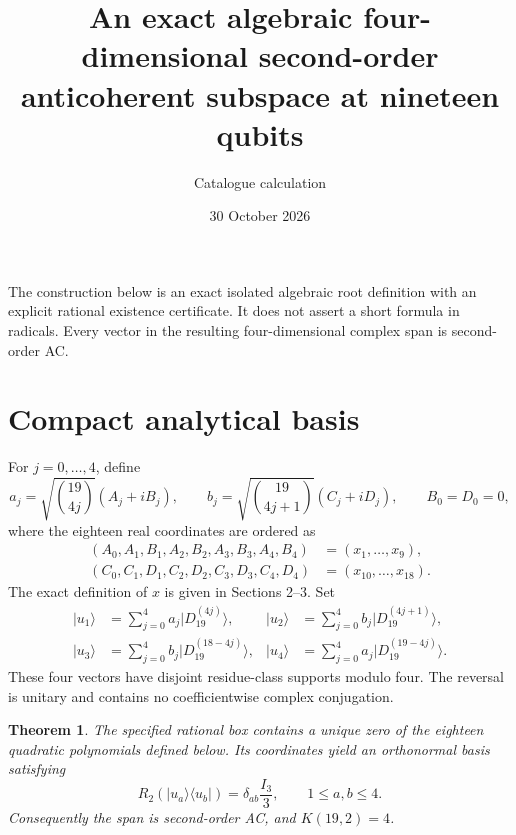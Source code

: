 \documentclass[11pt]{article}
\title{An exact algebraic four-dimensional second-order anticoherent subspace at nineteen qubits}
\author{Catalogue calculation}\date{30 October 2026}
\newcommand{\D}[1]{|D_{19}^{(#1)}\rangle}
\newtheorem{theorem}{Theorem}
\begin{document}
\maketitle
The construction below is an exact isolated algebraic root definition with an explicit
rational existence certificate. It does not assert a short formula in radicals.
Every vector in the resulting four-dimensional complex span is second-order AC.

\section{Compact analytical basis}
For $j=0,\ldots,4$, define
\[
 a_j=\sqrt{\binom{19}{4j}}(A_j+iB_j),\qquad
 b_j=\sqrt{\binom{19}{4j+1}}(C_j+iD_j),\qquad B_0=D_0=0,
\]
where the eighteen real coordinates are ordered as
\begin{align*}
(A_0,A_1,B_1,A_2,B_2,A_3,B_3,A_4,B_4)&=(x_1,\ldots,x_9),\\
(C_0,C_1,D_1,C_2,D_2,C_3,D_3,C_4,D_4)&=(x_{10},\ldots,x_{18}).
\end{align*}
The exact definition of $x$ is given in Sections 2--3. Set
\begin{align*}
|u_1\rangle&=\sum_{j=0}^4a_j\D{4j},&
|u_2\rangle&=\sum_{j=0}^4b_j\D{4j+1},\\
|u_3\rangle&=\sum_{j=0}^4b_j\D{18-4j},&
|u_4\rangle&=\sum_{j=0}^4a_j\D{19-4j}.
\end{align*}
These four vectors have disjoint residue-class supports modulo four.
The reversal is unitary and contains no coefficientwise complex conjugation.

\begin{theorem}
The specified rational box contains a unique zero of the eighteen quadratic
polynomials defined below. Its coordinates yield an orthonormal basis satisfying
\[
R_2(|u_a\rangle\langle u_b|)=\delta_{ab}\frac{I_3}{3},\qquad 1\le a,b\le4.
\]
Consequently the span is second-order AC, and $K(19,2)=4$.
\end{theorem}
\end{document}
